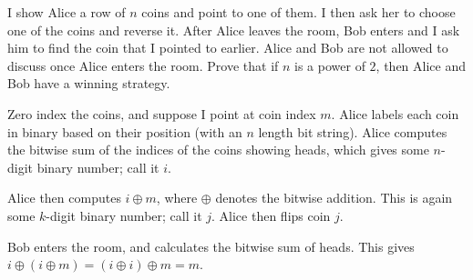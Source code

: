 \documentclass[10pt]{mypackage}
\begin{document}
\begin{problem}
  I show Alice a row of $n$ coins and point to one of them. I then ask her to choose one of the coins and reverse it. After Alice leaves the room, Bob enters and I ask him to find the coin that I pointed to earlier. Alice and Bob are not allowed to discuss once Alice enters the room. Prove that if $n$ is a power of $2$, then Alice and Bob have a winning strategy.
\end{problem}
\begin{solution}
  Zero index the coins, and suppose I point at coin index $m$. Alice labels each coin in binary based on their position (with an $n$ length bit string). Alice computes the bitwise sum of the indices of the coins showing heads, which gives some $n$-digit binary number; call it $i$.\newline

  Alice then computes $i\oplus m$, where $\oplus$ denotes the bitwise addition. This is again some $k$-digit binary number; call it $j$. Alice then flips coin $j$.\newline

  Bob enters the room, and calculates the bitwise sum of heads. This gives $i\oplus \left( i\oplus m \right)= \left( i\oplus i \right)\oplus m= m$.
\end{solution}
\end{document}
